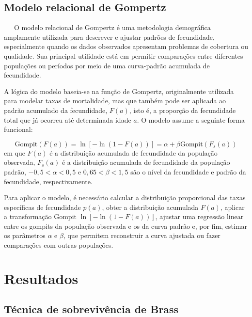 \documentclass[
  12pt,
  a4paper,
]{scrreprt}
\begin{document}
\section{Modelo relacional de
Gompertz}\label{modelo-relacional-de-gompertz}

~~~O modelo relacional de Gompertz é uma metodologia demográfica
amplamente utilizada para descrever e ajustar padrões de fecundidade,
especialmente quando os dados observados apresentam problemas de
cobertura ou qualidade. Sua principal utilidade está em permitir
comparações entre diferentes populações ou períodos por meio de uma
curva-padrão acumulada de fecundidade.

\vspace{12pt}

A lógica do modelo baseia-se na função de Gompertz, originalmente
utilizada para modelar taxas de mortalidade, mas que também pode ser
aplicada ao padrão acumulado da fecundidade, \(F\left(a\right)\), isto
é, a proporção da fecundidade total que já ocorreu até determinada idade
\(a\). O modelo assume a seguinte forma funcional:

\[
\text{Gompit}\left(F\left(a\right)\right) = \ln\left[-\ln\left(1-F\left(a\right)\right)\right] = \alpha + \beta\text{Gompit}\left(F_{s}\left(a\right)\right)
\] em que \(F\left(a\right)\) é a distribuição acumulada de fecundidade
da população observada, \(F_{s}\left(a\right)\) é a distribuição
acumulada de fecundidade da população padrão, \(-0,5< \alpha < 0,5\) e
\(0,65 < \beta < 1,5\) são o nível da fecundidade e padrão da
fecundidade, respectivamente.

\vspace{12pt}

Para aplicar o modelo, é necessário calcular a distribuição proporcional
das taxas específicas de fecundidade \(p\left(a\right)\), obter a
distribuição acumulada \(F\left(a\right)\), aplicar a transformação
Gompit \(\ln\left[-\ln\left(1 - F\left(a\right)\right)\right]\), ajustar
uma regressão linear entre os gompits da população observada e os da
curva padrão e, por fim, estimar os parâmetros \(\alpha\) e \(\beta\),
que permitem reconstruir a curva ajustada ou fazer comparações com
outras populações.

\chapter{Resultados}\label{resultados}

\section{Técnica de sobrevivência de
Brass}\label{tuxe9cnica-de-sobrevivuxeancia-de-brass-1}
\end{document}
